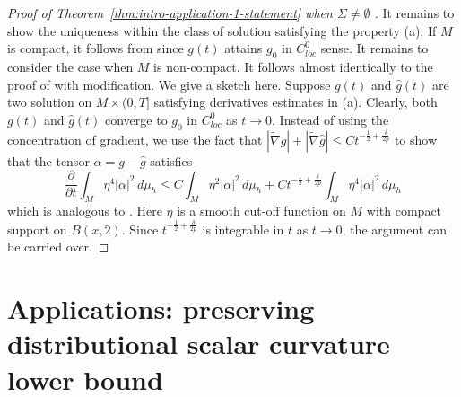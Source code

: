 \documentclass[12pt]{amsart}
\def\a{{\alpha}}
\theoremstyle{plain}
\theoremstyle{plain}
\theoremstyle{definition}
\theoremstyle{remark}
\numberwithin{equation}{subsection}
\newcommand{\hdel}{\tilde{\nabla}}
\begin{document}
\begin{proof}[Proof of Theorem~\ref{thm:intro-application-1-statement} when $\Sigma\neq \emptyset$ ]
It remains to show the uniqueness within the class of solution satisfying the property (a). If $M$ is compact, it follows from \cite{burkhardt-guim_pointwise_2019} since $g(t)$ attains $g_0$ in $C^0_{loc}$ sense.
It remains to consider the case when $M$ is non-compact. It follows almost identically to the proof of \cite[Theorem 3.1]{chu_ricci-deturck_2022} with modification. We give a sketch here. Suppose $g(t)$ and $\hat g(t)$ are two solution on $M\times (0,T]$ satisfying derivatives estimates in (a). Clearly, both $g(t)$ and $\hat g(t)$ converge to $g_0$ in $C^0_{loc}$ as $t\to 0$. Instead of using the concentration of gradient, we use the fact that $|\hdel g|+|\hdel \hat g|\leq Ct^{-\frac12 +\frac{\delta}{2p}}$ to show that the tensor $\a=g-\hat g$ satisfies 
\begin{equation}
\frac{\partial}{\partial t}\int_M \eta^4 |\a|^2 \,d\mu_h \leq C\int_M \eta^2 |\a|^2 \,d\mu_h +Ct^{-\frac12 +\frac{\delta}{2p}}\int_M \eta^4 |\a|^2 \,d\mu_h
\end{equation}
which  is analogous to \cite[(3.20)]{chu_ricci-deturck_2022}. Here $\eta$ is a smooth cut-off function on $M$ with compact support on $B(x,2)$. Since $t^{-\frac12 +\frac{\delta}{2p}}$ is integrable in $t$ as $t\to0$, the argument can be carried over.

\end{proof}


\section{Applications: preserving distributional scalar curvature lower bound}\label{sec:applications}
\end{document}
